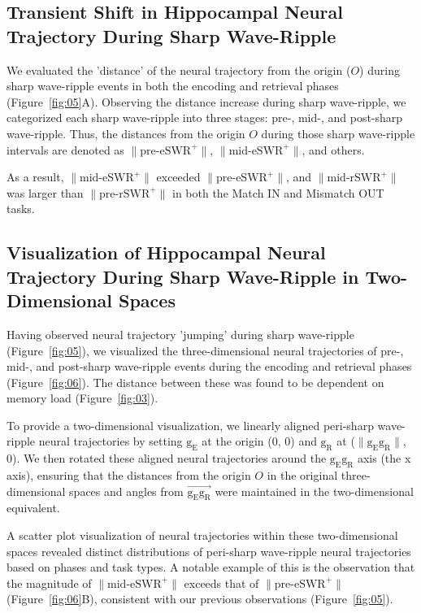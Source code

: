\subsection{Transient Shift in Hippocampal Neural Trajectory During Sharp Wave-Ripple}
We evaluated the 'distance' of the neural trajectory from the origin ($O$) during sharp wave-ripple events in both the encoding and retrieval phases (Figure~\ref{fig:05}A). Observing the distance increase during sharp wave-ripple, we categorized each sharp wave-ripple into three stages: pre-, mid-, and post-sharp wave-ripple. Thus, the distances from the origin $O$ during those sharp wave-ripple intervals are denoted as $\mathrm{\lVert \text{pre-eSWR}^+ \rVert}$, $\mathrm{\lVert \text{mid-eSWR}^+ \rVert}$, and others.

As a result, $\mathrm{\lVert \text{mid-eSWR}^+ \rVert}$ exceeded $\mathrm{\lVert \text{pre-eSWR}^+ \rVert}$, and $\mathrm{\lVert \text{mid-rSWR}^+ \rVert}$ was larger than $\mathrm{\lVert \text{pre-rSWR}^+ \rVert}$ in both the Match IN and Mismatch OUT tasks.

\subsection{Visualization of Hippocampal Neural Trajectory During Sharp Wave-Ripple in Two-Dimensional Spaces}
Having observed neural trajectory 'jumping' during sharp wave-ripple (Figure~\ref{fig:05}), we visualized the three-dimensional neural trajectories of pre-, mid-, and post-sharp wave-ripple events during the encoding and retrieval phases (Figure~\ref{fig:06}). The distance between these was found to be dependent on memory load (Figure~\ref{fig:03}).

To provide a two-dimensional visualization, we linearly aligned peri-sharp wave-ripple neural trajectories by setting $\mathrm{g_{E}}$ at the origin (0, 0) and $\mathrm{g_{R}}$ at ($\mathrm{\lVert g_{E}g_{R} \rVert}$, 0). We then rotated these aligned neural trajectories around the $\mathrm{g_{E}g_{R}}$ axis (the x axis), ensuring that the distances from the origin $O$ in the original three-dimensional spaces and angles from $\overrightarrow{\mathrm{g_{E}g_{R}}}$ were maintained in the two-dimensional equivalent.

A scatter plot visualization of neural trajectories within these two-dimensional spaces revealed distinct distributions of peri-sharp wave-ripple neural trajectories based on phases and task types. A notable example of this is the observation that the magnitude of $\mathrm{\lVert \text{mid-eSWR}^+ \rVert}$ exceeds that of $\mathrm{\lVert \text{pre-eSWR}^+ \rVert}$ (Figure~\ref{fig:06}B), consistent with our previous observations (Figure~\ref{fig:05}).

